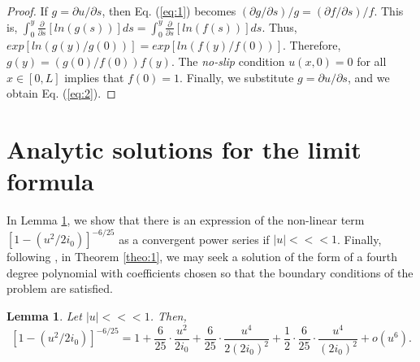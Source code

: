 \documentclass{article}
\newtheorem{lemma}{Lemma}
\begin{document}
\begin{proof}
If $g=\partial u/ \partial s$, then Eq. (\ref{eq:1}) becomes $(\partial g/\partial s)/g=(\partial f/\partial s)/f$.
This is, 
$\int_0^y\frac{\partial}{\partial s}\left[ln\left(g(s)\right)\right]ds=
\int_0^y\frac{\partial}{\partial s}\left[ln\left(f(s)\right)\right]ds$.
Thus, $exp\left[ln\left(g(y)/g(0)\right)\right]=
exp\left[ln\left(f(y)/f(0)\right)\right]$.
Therefore, 
$g(y)=\left(g\left(0\right)/f\left(0\right)\right)f(y)$.
The \emph{no-slip} condition $u(x,0)=0 $ for all $x\in[0,L]$
implies that $f(0)=1$. Finally, we substitute $g=\partial u/\partial s$, and we obtain Eq. (\ref{eq:2}).
\end{proof}


\section{Analytic solutions for the limit formula}\label{s5}

In Lemma \ref{lem:2}, we show that there is an  expression of 
the non-linear term $\left[1-\left(u^2/2i_0\right)\right]^{-6/25}$
as a convergent power series if $|u|<\!\!<\!\!<1$.
Finally, following \cite{Dorod42,Lees50}, in Theorem \ref{theo:1}, 
we may seek a solution of the form
of a fourth degree polynomial with coefficients chosen so that
the boundary conditions of the problem are satisfied. 


\begin{lemma}\label{lem:2}
Let $|u|<\!\!<\!\!<1$. Then,
\begin{equation}\label{eq:3}
    \left[1-\left(u^2/2i_0\right)\right]^{-6/25}=
    1+\frac{6}{25}\cdot \frac{u^2}{2i_0}
    +\frac{6}{25}\cdot \frac{u^4}{2(2i_0)^2}
    +\frac{1}{2}\cdot\frac{6}{25}\cdot \frac{u^4}{(2i_0)^2}+o(u^6).
\end{equation}
\end{lemma}
\end{document}

